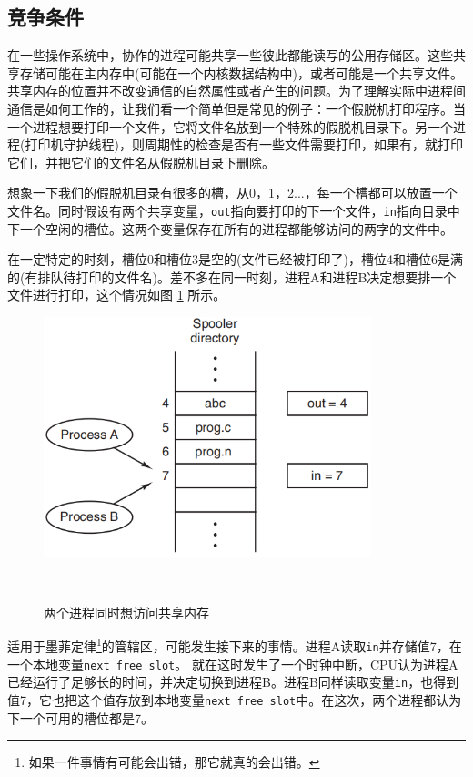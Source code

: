 	\subsection{竞争条件}
	
	在一些操作系统中，协作的进程可能共享一些彼此都能读写的公用存储区。这些共享存储可能在主内存中(可能在一个内核数据结构中)，或者可能是一个共享文件。共享内存的位置并不改变通信的自然属性或者产生的问题。为了理解实际中进程间通信是如何工作的，让我们看一个简单但是常见的例子：一个假脱机打印程序。当一个进程想要打印一个文件，它将文件名放到一个特殊的假脱机目录下。另一个进程(打印机守护线程)，则周期性的检查是否有一些文件需要打印，如果有，就打印它们，并把它们的文件名从假脱机目录下删除。
	
	想象一下我们的假脱机目录有很多的槽，从0，1，2...，每一个槽都可以放置一个文件名。同时假设有两个共享变量，\texttt{out}指向要打印的下一个文件，\texttt{in}指向目录中下一个空闲的槽位。这两个变量保存在所有的进程都能够访问的两字的文件中。
	
	在一定特定的时刻，槽位0和槽位3是空的(文件已经被打印了)，槽位4和槽位6是满的(有排队待打印的文件名)。差不多在同一时刻，进程A和进程B决定想要排一个文件进行打印，这个情况如图 \ref{fig:sharedmemory} 所示。
	
	\begin{figure}[ht]\small
		\centering
		\includegraphics[width=0.85\textwidth]{FIG/2-21.png}
		\caption{两个进程同时想访问共享内存}　\label{fig:sharedmemory}
	\end{figure}

	适用于墨菲定律\footnote{如果一件事情有可能会出错，那它就真的会出错。}的管辖区，可能发生接下来的事情。进程A读取\texttt{in}并存储值7，在一个本地变量\texttt{next free slot}。
	就在这时发生了一个时钟中断，CPU认为进程A已经运行了足够长的时间，并决定切换到进程B。进程B同样读取变量\texttt{in}，也得到值7，它也把这个值存放到本地变量\texttt{next free slot}中。在这次，两个进程都认为下一个可用的槽位都是7。
	
